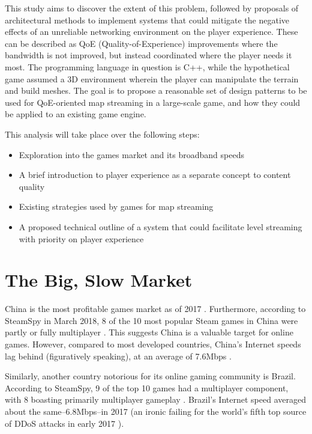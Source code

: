 \documentclass{scrartcl}
\begin{document}
This study aims to discover the extent of this problem, followed by proposals of architectural methods to implement systems that could mitigate the negative effects of an unreliable networking environment on the player experience. These can be described as QoE (Quality-of-Experience) improvements where the bandwidth is not improved, but instead coordinated where the player needs it most. The programming language in question is C++, while the hypothetical game assumed a 3D environment wherein the player can manipulate the terrain and build meshes. The goal is to propose a reasonable set of design patterns to be used for QoE-oriented map streaming in a large-scale game, and how they could be applied to an existing game engine.

This analysis will take place over the following steps:

\begin{itemize}
\item Exploration into the games market and its broadband speeds
\item A brief introduction to player experience as a separate concept to content quality
\item Existing strategies used by games for map streaming
\item A proposed technical outline of a system that could facilitate level streaming with priority on player experience
\end{itemize}

\section{The Big, Slow Market}
China is the most profitable games market as of 2017 \cite{chinamarket}. Furthermore, according to SteamSpy in March 2018, 8 of the 10 most popular Steam games in China were partly or fully multiplayer \cite{steamchina}. This suggests China is a valuable target for online games. However, compared to most developed countries, China's Internet speeds lag behind (figuratively speaking), at an average of 7.6Mbps \cite{webspeeds}.

Similarly, another country notorious for its online gaming community is Brazil. According to SteamSpy, 9 of the top 10 games had a multiplayer component, with 8 boasting primarily multiplayer gameplay \cite{steambrazil}. Brazil's Internet speed averaged about the same--6.8Mbps--in 2017 \cite{webspeeds} (an ironic failing for the world's fifth top source of DDoS attacks in early 2017 \cite{websecurity}).
\end{document}
